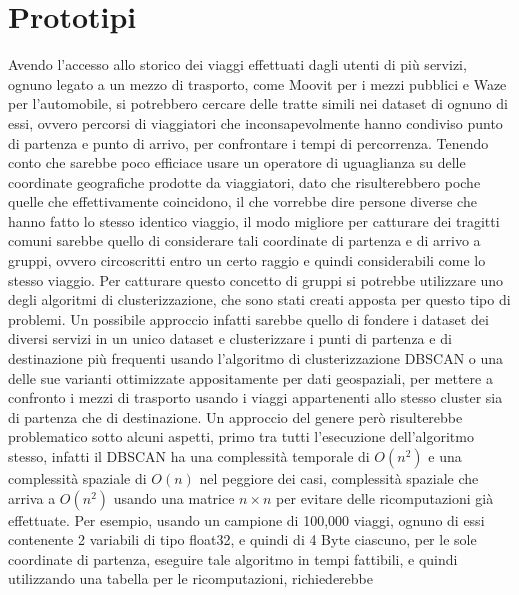 \section{Prototipi}

Avendo l'accesso allo storico dei viaggi effettuati dagli utenti di più servizi, ognuno legato a un mezzo di trasporto, come Moovit per i mezzi pubblici e Waze per l'automobile, si potrebbero cercare delle tratte simili nei dataset di ognuno di essi, ovvero percorsi di viaggiatori che inconsapevolmente hanno condiviso punto di partenza e punto di arrivo, per confrontare i tempi di percorrenza. Tenendo conto che sarebbe poco efficiace usare un operatore di uguaglianza su delle coordinate geografiche prodotte da viaggiatori, dato che risulterebbero poche quelle che effettivamente coincidono, il che vorrebbe dire persone diverse che hanno fatto lo stesso identico viaggio, il modo migliore per catturare dei tragitti comuni sarebbe quello di considerare tali coordinate di partenza e di arrivo a gruppi, ovvero circoscritti entro un certo raggio e quindi considerabili come lo stesso viaggio. Per catturare questo concetto di gruppi si potrebbe utilizzare uno degli algoritmi di clusterizzazione, che sono stati creati apposta per questo tipo di problemi. Un possibile approccio infatti sarebbe quello di fondere i dataset dei diversi servizi in un unico dataset e clusterizzare i punti di partenza e di destinazione più frequenti usando l'algoritmo di clusterizzazione DBSCAN\cite{ester1996} o una delle sue varianti ottimizzate appositamente per dati geospaziali\cite{zhou2003}\cite{borah2004}, per mettere a confronto i mezzi di trasporto usando i viaggi appartenenti allo stesso cluster sia di partenza che di destinazione. Un approccio del genere però risulterebbe problematico sotto alcuni aspetti, primo tra tutti l'esecuzione dell'algoritmo stesso, infatti il DBSCAN ha una complessità temporale di $O(n^{2})$ e una complessità spaziale di $O(n)$ nel peggiore dei casi, complessità spaziale che arriva a $O(n^2)$ usando una matrice $n \times n$ per evitare delle ricomputazioni già effettuate. Per esempio, usando un campione di 100,000 viaggi, ognuno di essi contenente 2 variabili di tipo float32, e quindi di 4 Byte ciascuno, per le sole coordinate di partenza, eseguire tale algoritmo in tempi fattibili, e quindi utilizzando una tabella per le ricomputazioni, richiederebbe 











